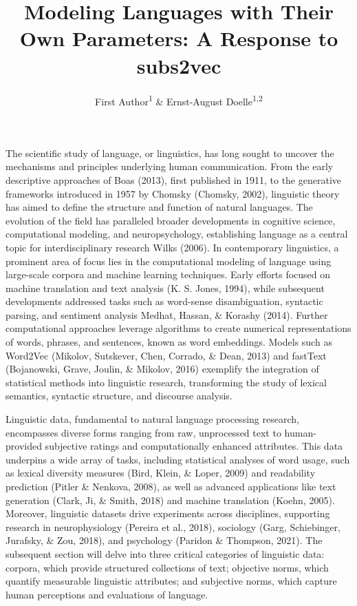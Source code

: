 \documentclass[
  man,floatsintext]{apa6}
\title{Modeling Languages with Their Own Parameters: A Response to subs2vec}
\author{First Author\textsuperscript{1} \& Ernst-August Doelle\textsuperscript{1,2}}
\date{}
\affiliation{\vspace{0.5cm}\textsuperscript{1} Wilhelm-Wundt-University\\\textsuperscript{2} Konstanz Business School}
\begin{document}
\maketitle

The scientific study of language, or linguistics, has long sought to uncover the mechanisms and principles underlying human communication. From the early descriptive approaches of Boas (2013), first published in 1911, to the generative frameworks introduced in 1957 by Chomsky (Chomsky, 2002), linguistic theory has aimed to define the structure and function of natural languages. The evolution of the field has paralleled broader developments in cognitive science, computational modeling, and neuropsychology, establishing language as a central topic for interdisciplinary research Wilks (2006). In contemporary linguistics, a prominent area of focus lies in the computational modeling of language using large-scale corpora and machine learning techniques. Early efforts focused on machine translation and text analysis (K. S. Jones, 1994), while subsequent developments addressed tasks such as word-sense disambiguation, syntactic parsing, and sentiment analysis Medhat, Hassan, \& Korashy (2014). Further computational approaches leverage algorithms to create numerical representations of words, phrases, and sentences, known as word embeddings. Models such as Word2Vec (Mikolov, Sutskever, Chen, Corrado, \& Dean, 2013) and fastText (Bojanowski, Grave, Joulin, \& Mikolov, 2016) exemplify the integration of statistical methods into linguistic research, transforming the study of lexical semantics, syntactic structure, and discourse analysis.

Linguistic data, fundamental to natural language processing research, encompasses diverse forms ranging from raw, unprocessed text to human-provided subjective ratings and computationally enhanced attributes. This data underpins a wide array of tasks, including statistical analyses of word usage, such as lexical diversity measures (Bird, Klein, \& Loper, 2009) and readability prediction (Pitler \& Nenkova, 2008), as well as advanced applications like text generation (Clark, Ji, \& Smith, 2018) and machine translation (Koehn, 2005). Moreover, linguistic datasets drive experiments across disciplines, supporting research in neurophysiology (Pereira et al., 2018), sociology (Garg, Schiebinger, Jurafsky, \& Zou, 2018), and psychology (Paridon \& Thompson, 2021). The subsequent section will delve into three critical categories of linguistic data: corpora, which provide structured collections of text; objective norms, which quantify measurable linguistic attributes; and subjective norms, which capture human perceptions and evaluations of language.
\end{document}
